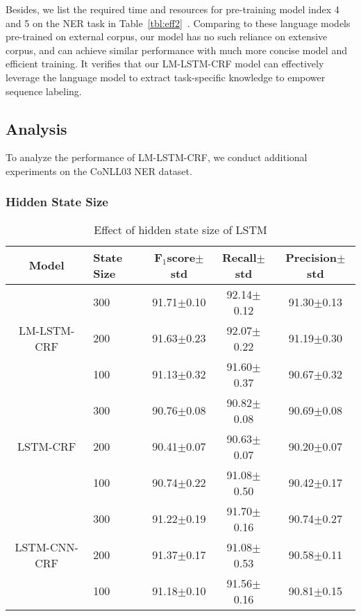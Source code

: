 \documentclass[letterpaper]{article} \usepackage{aaai18}  \usepackage{times}  \usepackage{helvet}  \usepackage{courier}  \usepackage{url}  \usepackage{graphicx}  \usepackage{multirow}
\newcommand{\our}{\textsc{LM-LSTM-CRF}\xspace}
\begin{document}
    Besides, we list the required time and resources for pre-training model index 4 and 5 on the NER task in Table~\ref{tbl:eff2}~\cite{jozefowicz2016exploring}.
    Comparing to these language models pre-trained on external corpus, our model has no such reliance on extensive corpus, and can achieve similar performance with much more concise model and efficient training.
    It verifies that our \our model can effectively leverage the language model to extract task-specific knowledge to empower sequence labeling.

\subsection{Analysis}

    To analyze the performance of \our, we conduct additional experiments on the CoNLL03 NER dataset. 

    \subsubsection{Hidden State Size}


\begin{table}
\center
\scalebox{0.65}
{
\begin{tabular}{c|l|c|c|c}
\hline
Model & State Size & F$_1$score$\pm$std &  Recall$\pm$std &Precision$\pm$std \\
\hline
\hline
\multirow{3}{*}{\our} & 300 &  91.71$\pm$0.10 &92.14$\pm$0.12 & 91.30$\pm$0.13 \\
\cline{2-5}
& 200 & 91.63$\pm$0.23 &92.07$\pm$0.22 & 91.19$\pm$0.30 \\
\cline{2-5}
& 100 & 91.13$\pm$0.32 &91.60$\pm$0.37 & 90.67$\pm$0.32 \\

\hline
\hline
\multirow{3}{*}{LSTM-CRF} & 300 & 90.76$\pm$0.08 &90.82$\pm$0.08 & 90.69$\pm$0.08 \\
\cline{2-5}
& 200 & 90.41$\pm$0.07 &90.63$\pm$0.07 & 90.20$\pm$0.07 \\
\cline{2-5}
& 100 & 90.74$\pm$0.22 &91.08$\pm$0.50 & 90.42$\pm$0.17 \\

\hline
\hline
\multirow{3}{*}{LSTM-CNN-CRF} & 300  & 91.22$\pm$0.19 & 91.70$\pm$0.16 & 90.74$\pm$0.27\\
\cline{2-5}
& 200  & 91.37$\pm$0.17 & 91.08$\pm$0.53 & 90.58$\pm$0.11\\
\cline{2-5}
& 100 & 91.18$\pm$0.10 & 91.56$\pm$0.16 & 90.81$\pm$0.15\\
\hline
\end{tabular}
}
\caption{Effect of hidden state size of LSTM}\label{tbl:size}
\end{table}
\end{document}
